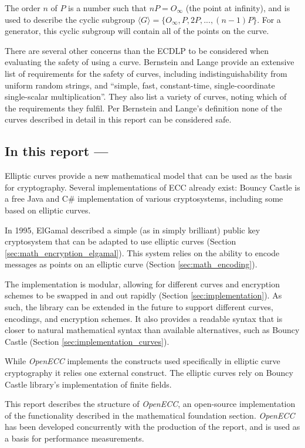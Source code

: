 The order \(n\) of \(P\) is a number such that \(nP = O_{\infty}\) (the point at infinity), and is used to describe
the cyclic subgroup \(\langle G \rangle = \{ O_\infty, P, 2P, ..., (n-1)P \} \). For a generator, this cyclic subgroup
will contain all of the points on the curve.

There are several other concerns than the ECDLP to be considered when evaluating the safety of using a curve. Bernstein and Lange
provide an extensive list of requirements for the safety of curves, including indistinguishability from uniform random
strings, and ``simple, fast, constant-time, single-coordinate single-scalar multiplication''. They also list a variety
of curves, noting which of the requirements they fulfil.\cite{safecurves} Per Bernstein and Lange's definition none of
the curves described in detail in this report can be considered safe.

\subsection{In this report ---}

Elliptic curves provide a new mathematical model that can be used as the basis for cryptography. Several
implementations of ECC already exist: Bouncy Castle is a free Java and C\# implementation of various cryptosystems,
including some based on elliptic curves.\cite{bouncycastle}

In 1995, ElGamal described a simple (as in simply brilliant) public key cryptosystem that can be adapted
to use elliptic curves (Section \ref{sec:math_encryption_elgamal}). This system relies on the ability to
encode messages as points on an elliptic curve (Section \ref{sec:math_encoding}).

The implementation is modular, allowing for different curves and encryption schemes to be swapped in and out
rapidly (Section \ref{sec:implementation}). As such, the library can be extended in the future to support different
curves, encodings, and encryption schemes. It also provides a readable syntax that is closer to natural mathematical
syntax than available alternatives, such as Bouncy Castle (Section \ref{sec:implementation_curves}).

While \emph{OpenECC} implements the constructs used specifically in elliptic curve cryptography it relies one external construct.
The elliptic curves rely on Bouncy Castle library's implementation of finite fields.

This report describes the structure of \emph{OpenECC}, an open-source implementation of the functionality
described in the mathematical foundation section. \emph{OpenECC} has been developed concurrently with the
production of the report, and is used as a basis for performance measurements.

